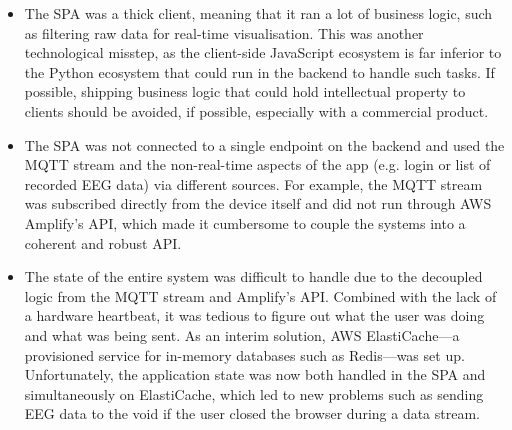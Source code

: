 \begin{itemize}
  \item The SPA was a thick client, meaning that it ran a lot of business logic, such as filtering raw data for real-time visualisation. This was another technological misstep, as the client-side JavaScript ecosystem is far inferior to the Python ecosystem that could run in the backend to handle such tasks. If possible, shipping business logic that could hold intellectual property to clients should be avoided, if possible, especially with a commercial product.
  \item The SPA was not connected to a single endpoint on the backend and used the MQTT stream and the non-real-time aspects of the app (e.g. login or list of recorded EEG data) via different sources. For example, the MQTT stream was subscribed directly from the device itself and did not run through AWS Amplify’s API, which made it cumbersome to couple the systems into a coherent and robust API.
  \item The state of the entire system was difficult to handle due to the decoupled logic from the MQTT stream and Amplify’s API. Combined with the lack of a hardware heartbeat, it was tedious to figure out what the user was doing and what was being sent. As an interim solution, AWS ElastiCache—a provisioned service for in-memory databases such as Redis—was set up. Unfortunately, the application state was now both handled in the SPA and simultaneously on ElastiCache, which led to new problems such as sending EEG data to the void if the user closed the browser during a data stream.
\end{itemize}
